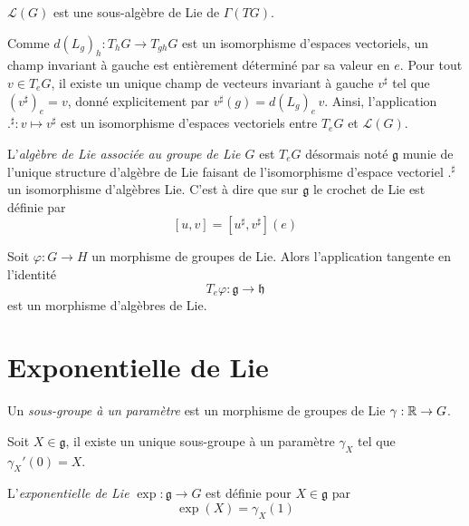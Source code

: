 \begin{proposition}
  $\mathcal{L}(G)$ est une sous-algèbre de Lie de $\Gamma(TG)$.
\end{proposition}

\omitted

Comme $d(L_g)_h : T_h G \to T_{gh} G$ est un isomorphisme d'espaces vectoriels, un champ invariant à gauche est entièrement déterminé par sa valeur en $e$. Pour tout $v \in T_e G$, il existe un unique champ de vecteurs invariant à gauche $v^\sharp$ tel que $(v^\sharp)_e = v$, donné explicitement par $v^\sharp(g) = d(L_g)_e\, v$. Ainsi, l'application $.^\sharp : v \mapsto v^\sharp$ est un isomorphisme d'espaces vectoriels entre $T_e G$ et $\mathcal{L}(G)$.

\begin{definition}
    L'\emph{algèbre de Lie associée au groupe de Lie $G$} est $T_e G$ désormais noté $\mathfrak{g}$ munie de l'unique structure d'algèbre de Lie faisant de l'isomorphisme d'espace vectoriel $.^\sharp$ un isomorphisme d'algèbres Lie. C'est à dire que sur $\mathfrak{g}$ le crochet de Lie est définie par 
    $$[u, v] = [u^\sharp, v^\sharp](e)$$
\end{definition}

\begin{proposition}
  Soit $\varphi : G \to H$ un morphisme de groupes de Lie. Alors l'application tangente en l'identité
  $$T_e\varphi : \mathfrak{g} \longrightarrow \mathfrak{h}$$
  est un morphisme d'algèbres de Lie.
\end{proposition}

\omitted

\section{Exponentielle de Lie}

\begin{definition}
  Un \emph{sous-groupe à un paramètre} est un morphisme de groupes de Lie $\gamma: \mathbb{R} \to G$.
\end{definition}

\begin{proposition}
  Soit $X\in \mathfrak{g}$, il existe un unique sous-groupe à un paramètre $\gamma_X$ tel que $\gamma_X'(0) = X$.
\end{proposition}

\omitted

\begin{definition}
  L'\emph{exponentielle de Lie} $\exp: \mathfrak{g} \to G$ est définie pour $X\in \mathfrak{g}$ par 
  $$\exp(X) = \gamma_X(1)$$
\end{definition}

